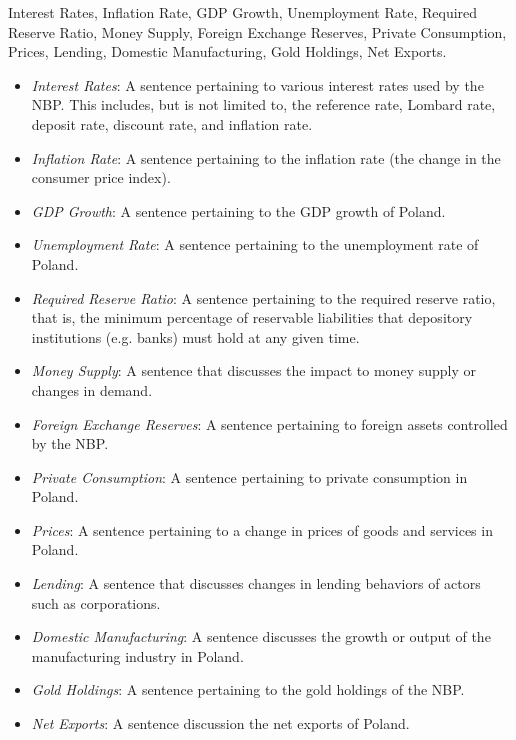  Interest Rates, Inflation Rate, GDP Growth, Unemployment Rate, Required Reserve Ratio, Money Supply, Foreign Exchange Reserves, Private Consumption, Prices, Lending, Domestic Manufacturing, Gold Holdings, Net Exports.

\begin{itemize}
    \item \emph{Interest Rates}: A sentence pertaining to various interest rates used by the NBP. This includes, but is not limited to, the reference rate, Lombard rate, deposit rate, discount rate, and inflation rate. 
    \item \emph{Inflation Rate}: A sentence pertaining to the inflation rate (the change in the consumer price index).
    \item \emph{GDP Growth}: A sentence pertaining to the GDP growth of Poland.
    \item \emph{Unemployment Rate}: A sentence pertaining to the unemployment rate of Poland.
    \item \emph{Required Reserve Ratio}: A sentence pertaining to the required reserve ratio, that is, the minimum percentage of reservable liabilities that depository institutions (e.g. banks) must hold at any given time.
    \item \emph{Money Supply}: A sentence that discusses the impact to money supply or changes in demand.
    \item \emph{Foreign Exchange Reserves}: A sentence pertaining to foreign assets controlled by the NBP.
    \item \emph{Private Consumption}: A sentence pertaining to private consumption in Poland.
    \item \emph{Prices}: A sentence pertaining to a change in prices of goods and services in Poland.
    \item \emph{Lending}: A sentence that discusses changes in lending behaviors of actors such as corporations.
    \item \emph{Domestic Manufacturing}: A sentence discusses the growth or output of the manufacturing industry in Poland.
    \item \emph{Gold Holdings}: A sentence pertaining to the gold holdings of the NBP.
    \item \emph{Net Exports}: A sentence discussion the net exports of Poland.
\end{itemize}

